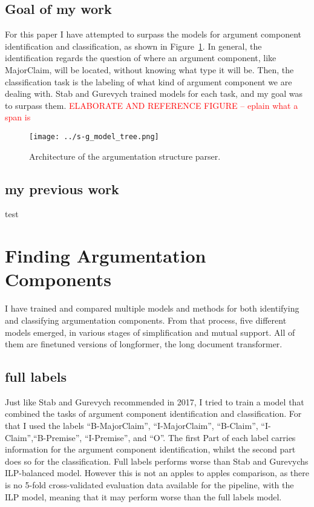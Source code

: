 \documentclass[12]{article}
\theoremstyle{mytheoremstyle}
\theoremstyle{mytheoremstyle}
\theoremstyle{myproblemstyle}
\begin{document}
  \subsection{Goal of my work}
  For this paper I have attempted to surpass the models for argument component identification and classification, as shown in Figure~\ref{fig:model_tree}. In general, the identification regards the question of where an argument component, like MajorClaim, will be located, without knowing what type it will be. Then, the classification task is the labeling of what kind of argument component we are dealing with. Stab and Gurevych trained models for each task, and my goal was to surpass them.  \textcolor{red}{ELABORATE AND REFERENCE FIGURE -- eplain what a span is} 
  \begin{figure}[!h]
    \centering
    \texttt{[image: ../s-g\_model\_tree.png]}
    \caption{Architecture of the argumentation structure parser.}
    \label{fig:model_tree}
  \end{figure}
  \subsection{my previous work}
  test
  \section{Finding Argumentation Components}
  I have trained and compared multiple models and methods for both identifying and classifying argumentation components. From that process, five different models emerged, in various stages of simplification and mutual support. All of them are finetuned versions of longformer\cite{beltagy2020longformer}, the long document transformer.
  \subsection{full labels} \label{full labels}
  Just like Stab and Gurevych recommended in 2017, I tried to train a model that combined the tasks of argument component identification and classification. For that I used the labels ``B-MajorClaim'', ``I-MajorClaim'', ``B-Claim'', ``I-Claim'',``B-Premise'', ``I-Premise'', and ``O''. The first Part of each label carries information for the argument component identification, whilst the second part does so for the classification. Full labels performs worse than Stab and Gurevychs ILP-balanced model\cite{stab-gurevych-2017-parsing}. However this is not an apples to apples comparison, as there is no 5-fold cross-validated evaluation data available for the pipeline, with the ILP model, meaning that it may perform worse than the full labels model. 
\end{document}
